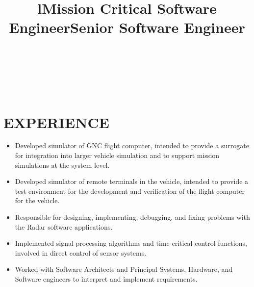 \documentclass[margin]{res}
\begin{document}
\begin{resume}

\begin{format}
\title{l}\\
\\
\body\\
\end{format}

\section{EXPERIENCE}
\phantom{spacing}
\title{\textbf{Mission Critical Software Engineer}}
\begin{position}\phantom{spacing}
\begin{itemize}[noitemsep, topsep=0pt]
\item Developed simulator of GNC flight computer, intended to provide a surrogate for integration into larger vehicle simulation and to support mission simulations at the system level.
\item Developed simulator of remote terminals in the vehicle, intended to provide a test environment for the development and verification of the flight computer for the vehicle.
\end{itemize}
\end{position}

\title{\textbf{Senior Software Engineer}}
\begin{position}\phantom{spacing}
\begin{itemize}[noitemsep, topsep=0pt]
\item Responsible for designing, implementing, debugging, and fixing problems with the Radar software applications.
\item Implemented signal processing algorithms and time critical control functions, involved in direct control of sensor systems. 
\item Worked with Software Architects and Principal Systems, Hardware, and Software engineers to interpret and implement requirements. 
\end{itemize}
\end{position}


\end{resume}
\end{document}

